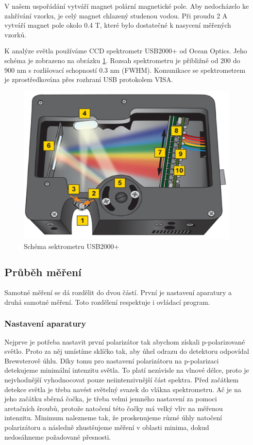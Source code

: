 V našem uspořádání vytváří magnet polární magnetické pole. Aby nedocházelo ke zahřívání vzorku, je celý magnet chlazený studenou vodou. Při proudu 2 A vytváří magnet pole okolo 0.4 T, které bylo dostatečné k nasycení měřených vzorků. %

K analýze světla používáme CCD spektrometr USB2000+ od Ocean Optics. Jeho schéma je zobrazeno na obrázku  \ref{USB2000+ schema}. 
Rozsah spektrometru je přibližně od 200 do 900 nm s rozlišovací schopností 0.3 nm (FWHM). Komunikace se spektrometrem je zprostředkována přes rozhraní USB protokolem VISA. 

\begin{figure}
    \begin{center}
    \includegraphics[width=5in]{img/usb4openbench.eps}
    \end{center}
    \caption{Schéma sektrometru USB2000+ \cite{USB2000}}
    \label{USB2000+ schema}
\end{figure}

\subsection{Průběh měření}
Samotné měření se dá rozdělit do dvou částí. První je nastavení aparatury a druhá samotné měření. Toto rozdělení respektuje i ovládací program.
\subsubsection{Nastavení aparatury}
Nejprve je potřeba nastavit první polarizátor tak abychom získali p-polarizované světlo. 
Proto za něj umístíme sklíčko tak, aby úhel odrazu do detektoru odpovídal Brewsterově úhlu. 
Díky tomu pro nastavení polarizátoru na p-polarizaci detekujeme minimální intenzitu světla. 
To platí nezávisle na vlnové délce, proto je nejvhodnější vyhodnocovat pouze neiintenzivnější část spektra. 
Před začátkem detekce světla je třeba navést světelný svazek do vlákna spektrometru. Ač je na jeho začátku sběrná čočka, 
je třeba velmi jemného nastavení za pomoci aretačních šroubů, protože natočení této čočky má velký vliv na měřenou intenzitu.
Minimum nalezneme tak, že proskenujeme různé úhly natočení polarizátoru a následně zhustšujeme měření v oblasti minima, dokud nedosáhneme požadované přesnosti.

